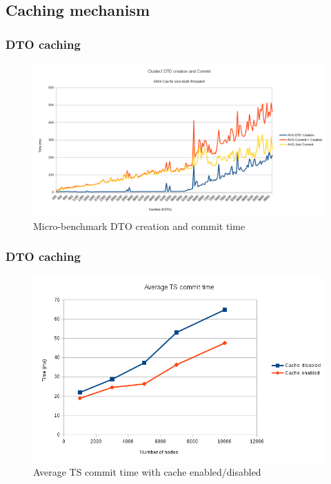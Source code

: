 \documentclass{beamer}
\begin{document}
\subsection{Caching mechanism}
\begin{frame}
\frametitle{DTO caching}

\begin{figure}
\centering
\includegraphics[scale=0.37]{resources/cache_create_commit.png}
\caption{Micro-benchmark DTO creation and commit time}
\end{figure}
\end{frame}

\begin{frame}
\frametitle{DTO caching}

\begin{figure}
\centering
\includegraphics[scale=0.5]{resources/avg_commit_cache_en_di.png}
\caption{Average TS commit time with cache enabled/disabled}
\end{figure}
\end{frame}
\end{document}
